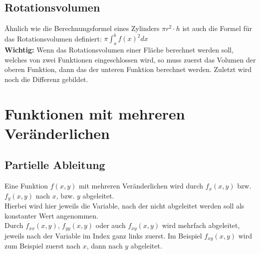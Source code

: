 \documentclass[12pt, a4paper]{scrreprt}
\begin{document}
\section{Rotationsvolumen}

Ähnlich wie die Berechnungsformel eines Zylinders \(\pi r^2 \cdot h\) ist auch die Formel für das Rotationsvolumen definiert: \(\pi \int_a^b f(x)^2 dx\)\\[1em]
\textbf{Wichtig:} Wenn das Rotationsvolumen einer Fläche berechnet werden soll, welches von zwei Funktionen eingeschlossen wird, so muss zuerst das Volumen der oberen Funktion, dann das der unteren Funktion berechnet werden. Zuletzt wird noch die Differenz gebildet.

\chapter{Funktionen mit mehreren Veränderlichen}

\section{Partielle Ableitung}

Eine Funktion \(f(x, y)\) mit mehreren Veränderlichen wird durch \(f_x(x, y)\) bzw. \(f_y(x, y)\) nach \(x\), bzw. \(y\) abgeleitet.\\
Hierbei wird hier jeweils die Variable, nach der nicht abgeleitet werden soll als konstanter Wert angenommen.\\
Durch \(f_{xx}(x, y)\), \(f_{yy}(x, y)\) oder auch \(f_{xy}(x, y)\) wird mehrfach abgeleitet, jeweils nach der Variable im Index ganz links zuerst. Im Beispiel \(f_{xy}(x, y)\) wird zum Beispiel zuerst nach \(x\), dann nach \(y\) abgeleitet.
\end{document}
